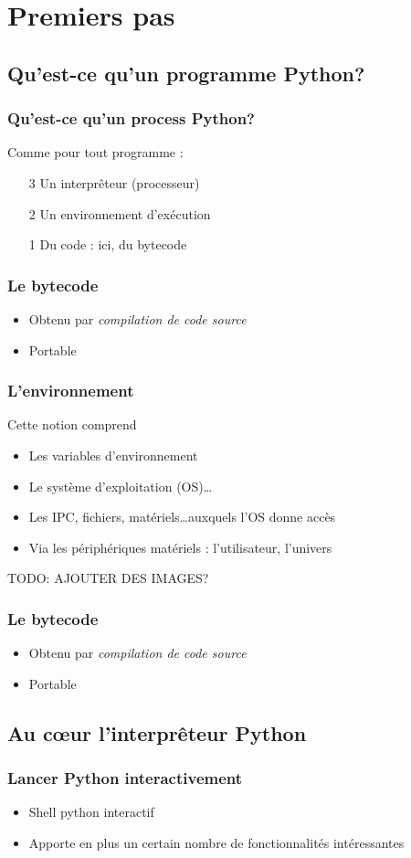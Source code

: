 \section{Premiers pas}

\subsection{Qu'est-ce qu'un programme Python?}
\begin{frame}[fragile]
  \frametitle{Qu'est-ce qu'un process Python?}
  Comme pour tout programme :
  \begin{itemize}
    \item[3] Un interprêteur (processeur)
    \item[2] Un environnement d'exécution
    \item[1] Du code : ici, du bytecode
  \end{itemize}
\end{frame}

\begin{frame}[fragile]
  \frametitle{Le bytecode}
  \begin{itemize}
    \item Obtenu par \em{compilation} de code source
    \item Portable
  \end{itemize}
\end{frame}

\begin{frame}[fragile]
  \frametitle{L'environnement}
  Cette notion comprend
  \begin{itemize}
    \item Les variables d'environnement \pause
    \item Le système d'exploitation (OS)\ldots \pause
    \item Les IPC, fichiers, matériels\ldots auxquels l'OS donne accès \pause
    \item Via les périphériques matériels : l'utilisateur, l'univers
  \end{itemize}
  TODO: AJOUTER DES IMAGES?
\end{frame}

\begin{frame}[fragile]
  \frametitle{Le bytecode}
  \begin{itemize}
    \item Obtenu par \em{compilation} de code source
    \item Portable
  \end{itemize}
\end{frame}


\subsection{Au c\oe ur l'interprêteur Python}
\begin{frame}[fragile]
  \frametitle{Lancer Python interactivement}
  \begin{itemize}
    \item Shell python interactif
    \item Apporte en plus un certain nombre de fonctionnalités intéressantes
  \end{itemize}
\end{frame}
\newpage
